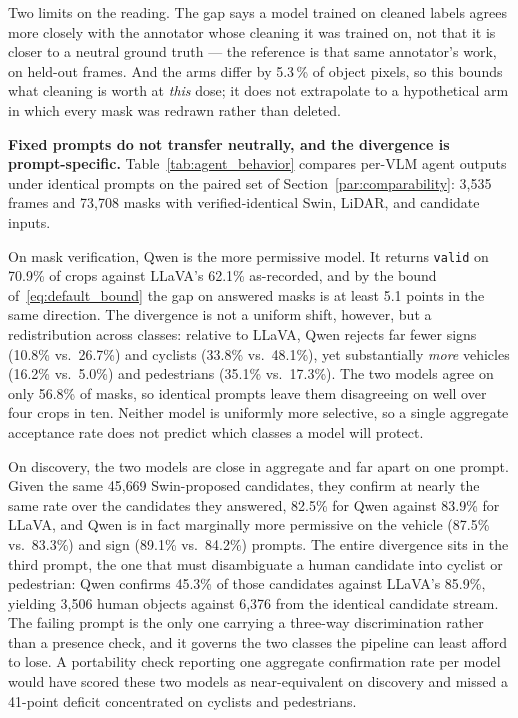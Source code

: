 \documentclass[conference]{IEEEtran}
\begin{document}
Two limits on the reading. The gap says a model trained on cleaned labels agrees more closely with the
annotator whose cleaning it was trained on, not that it is closer to a neutral ground truth --- the
reference is that same annotator's work, on held-out frames. And the arms differ by 5.3\,\% of object
pixels, so this bounds what cleaning is worth at \emph{this} dose; it does not extrapolate to a
hypothetical arm in which every mask was redrawn rather than deleted.



\textbf{Fixed prompts do not transfer neutrally, and the divergence is prompt-specific.}
Table~\ref{tab:agent_behavior} compares per-VLM agent outputs under identical prompts on the paired set of Section~\ref{par:comparability}: 3{,}535 frames and 73{,}708 masks with verified-identical Swin, LiDAR, and candidate inputs.

On mask verification, Qwen is the more permissive model.
It returns \texttt{valid} on 70.9\% of crops against LLaVA's 62.1\% as-recorded, and by the bound of~\eqref{eq:default_bound} the gap on answered masks is at least 5.1 points in the same direction.
The divergence is not a uniform shift, however, but a redistribution across classes: relative to LLaVA, Qwen rejects far fewer signs (10.8\% vs.\ 26.7\%) and cyclists (33.8\% vs.\ 48.1\%), yet substantially \emph{more} vehicles (16.2\% vs.\ 5.0\%) and pedestrians (35.1\% vs.\ 17.3\%).
The two models agree on only 56.8\% of masks, so identical prompts leave them disagreeing on well over four crops in ten.
Neither model is uniformly more selective, so a single aggregate acceptance rate does not predict which classes a model will protect.

On discovery, the two models are close in aggregate and far apart on one prompt.
Given the same 45{,}669 Swin-proposed candidates, they confirm at nearly the same rate over the candidates they answered, 82.5\% for Qwen against 83.9\% for LLaVA, and Qwen is in fact marginally more permissive on the vehicle (87.5\% vs.\ 83.3\%) and sign (89.1\% vs.\ 84.2\%) prompts.
The entire divergence sits in the third prompt, the one that must disambiguate a human candidate into cyclist or pedestrian: Qwen confirms 45.3\% of those candidates against LLaVA's 85.9\%, yielding 3{,}506 human objects against 6{,}376 from the identical candidate stream.
The failing prompt is the only one carrying a three-way discrimination rather than a presence check, and it governs the two classes the pipeline can least afford to lose.
A portability check reporting one aggregate confirmation rate per model would have scored these two models as near-equivalent on discovery and missed a 41-point deficit concentrated on cyclists and pedestrians.
\end{document}
